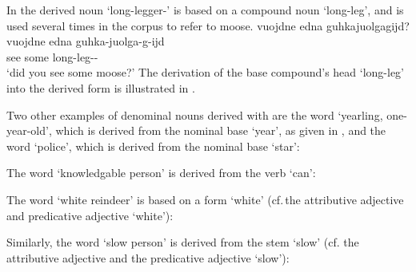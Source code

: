 In  the derived noun  ‘long-legger-’ is based on a compound noun  ‘long-leg’, and is used several times in the corpus to refer to moose. 
\ea\label{NMLZ2ex1}
\glll	vuojdne edna guhkajuolgagijd?\\
	vuojdne edna guhka-juolga-g-ijd\\
	see\BS{} some long-leg--\\\nopagebreak
\trans 	‘did you see some moose?’	
\z
The derivation of the base compound’s head  ‘long-leg’ into the derived form is illustrated in . 
\ea\label{NMLZ2ex2}
\z

Two other examples of denominal nouns derived with  are the word  ‘yearling, one-year-old’, which is derived from the nominal base  ‘year’, as given in , and the word  ‘police’, which is derived from the nominal base  ‘star’: %
\ea\label{NMLZ2ex3a}
\z
\ea\label{NMLZ2ex3c}
\z

The word  ‘knowledgable person’ is derived from the verb \mbox{} ‘can’: %
\ea\label{NMLZ2ex3b}
\z

The word  ‘white reindeer’ is based on a form  ‘white’ (cf.\,the attributive adjective  and predicative adjective  ‘white’): %
\ea\label{NMLZ2ex4}
\z

Similarly, the word  ‘slow person’ is derived from the stem  ‘slow’ (cf. the attributive adjective  and the predicative adjective \mbox{} ‘slow’): %
\ea\label{NMLZ2ex5}
\z

